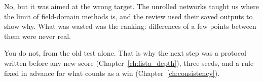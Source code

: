 \begin{defend}
No, but it was aimed at the wrong target. The unrolled networks taught us where the limit of field-domain methods is,
and the review used their saved outputs to show why. What was wasted was the ranking: differences of a few points
between them were never real.
\end{defend}

\begin{defend}
You do not, from the old test alone. That is why the next step was a protocol written before any new score
(Chapter~\ref{ch:fista_depth}), three seeds, and a rule fixed in advance for what counts as a win
(Chapter~\ref{ch:consistency}).
\end{defend}

